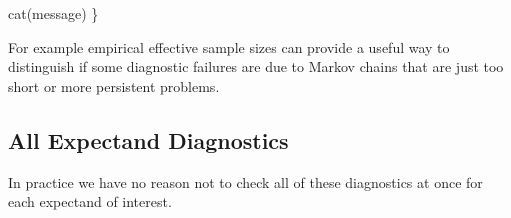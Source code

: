 \documentclass[
  letterpaper,
  DIV=11,
  numbers=noendperiod]{scrartcl}
\newenvironment{Shaded}{\begin{snugshade}}{\end{snugshade}}
\newcommand{\NormalTok}[1]{\textcolor[rgb]{0.00,0.23,0.31}{#1}}
\begin{document}
\begin{Shaded}
\begin{Highlighting}[]
\NormalTok{  cat(message)}
\NormalTok{\}}
\end{Highlighting}
\end{Shaded}

For example empirical effective sample sizes can provide a useful way to
distinguish if some diagnostic failures are due to Markov chains that
are just too short or more persistent problems.

\hypertarget{all-expectand-diagnostics}{%
\subsection{All Expectand Diagnostics}\label{all-expectand-diagnostics}}

In practice we have no reason not to check all of these diagnostics at
once for each expectand of interest.
\end{document}
